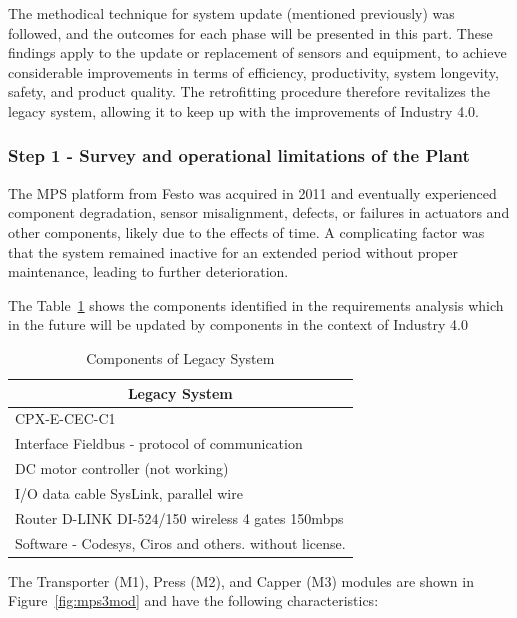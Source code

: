 \documentclass[journal]{IEEEtran}
\begin{document}
The methodical technique for system update (mentioned previously) was followed, and the outcomes for each phase will be presented in this part. These findings apply to the update or replacement of sensors and equipment, to achieve considerable improvements in terms of efficiency, productivity, system longevity, safety, and product quality. The retrofitting procedure therefore revitalizes the legacy system, allowing it to keep up with the improvements of Industry 4.0.

\subsubsection{Step 1 - Survey and operational limitations of the Plant}

The MPS platform from Festo was acquired in 2011 and eventually experienced component degradation, sensor misalignment, defects, or failures in actuators and other components, likely due to the effects of time. A complicating factor was that the system remained inactive for an extended period without proper maintenance, leading to further deterioration. 

The Table~\ref{tab:step1} shows the components identified in the requirements analysis which in the future will be updated by components in the context of Industry 4.0

\begin{table}[]
\caption{Components of Legacy System}
\label{tab:step1}
\begin{tabular}{l}
\hline
\multicolumn{1}{c}{\textbf{Legacy System}}             \\ \hline
CPX-E-CEC-C1                                           \\
Interface Fieldbus - protocol of communication         \\
DC motor controller (not working)                            \\
I/O data cable SysLink, parallel wire                  \\
Router D-LINK DI-524/150 wireless 4 gates 150mbps      \\
Software - Codesys, Ciros and others. without license. \\ \hline
\end{tabular}
\end{table}

The Transporter (M1), Press (M2), and Capper (M3) modules are shown in Figure~\ref{fig:mps3mod} and have the following characteristics:
\end{document}
